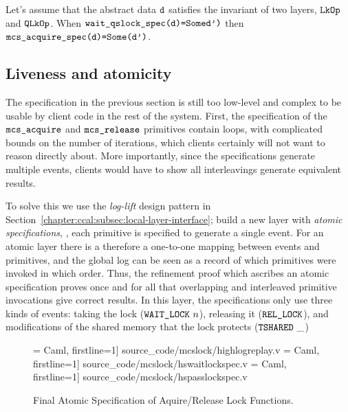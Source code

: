 \begin{theorem} 
    Let's assume that the abstract data ${\mathrm{\texttt{d}}}$ satisfies the invariant of two layers,
    ${\mathrm{\texttt{LkOp}}}$ and ${\mathrm{\texttt{QLkOp}}}$. When 
${\mathrm{\texttt{wait\_qslock\_spec}}}{\mathrm{\texttt{(d)=}}}{\mathrm{\texttt{Some}}}{\mathrm{\texttt{d')}}}$ then 
${\mathrm{\texttt{mcs\_acquire\_spec}}}{\mathrm{\texttt{(d)=}}}{\mathrm{\texttt{Some}}}{\mathrm{\texttt{(d')}}}$.
\end{theorem}


\subsection{Liveness and atomicity}
\label{chapter:mcslock:sec:liveness-atomicity}

The specification in the previous section is still too low-level and
complex to be usable by client code in the rest of the system.  First,
the specification of the ${\mathrm{\texttt{mcs\_acquire}}}$ and
${\mathrm{\texttt{mcs\_release}}}$ primitives contain loops, with complicated
bounds on the number of iterations, which clients certainly will not
want to reason directly about.  More importantly, since the
specifications generate multiple events, clients would have to show
all interleavings generate equivalent results.

To solve this we use the \textit{log-lift} design
pattern in Section~\ref{chapter:ccal:subsec:local-layer-interface}; build a new layer with \emph{atomic specifications},
\ie, each primitive is specified to generate  a single event.
For an atomic layer there is a
therefore a one-to-one mapping between events and primitives, and the global log
can be seen as a record of which primitives were invoked in which
order. Thus, the refinement proof which ascribes an atomic
specification proves once and for all that overlapping and interleaved
primitive invocations give correct results.
In this layer, the specifications only use three kinds 
of events: taking the lock (${\mathrm{\texttt{WAIT\_LOCK}}}~{n}$),
releasing it (${\mathrm{\texttt{REL\_LOCK}}}$), and modifications of the shared
memory that the lock protects (${\mathrm{\texttt{TSHARED}}}~{\_}$)



\begin{figure}
 = Caml, firstline=1] {source_code/mcslock/highlogreplay.v}
 = Caml, firstline=1] {source_code/mcslock/hswaitlockspec.v}
 = Caml, firstline=1] {source_code/mcslock/hspasslockspec.v}
\caption{Final Atomic Specification of Aquire/Release Lock Functions.}
\label{fig:chapter:mcslock:hswaitlockspec}
\end{figure}


